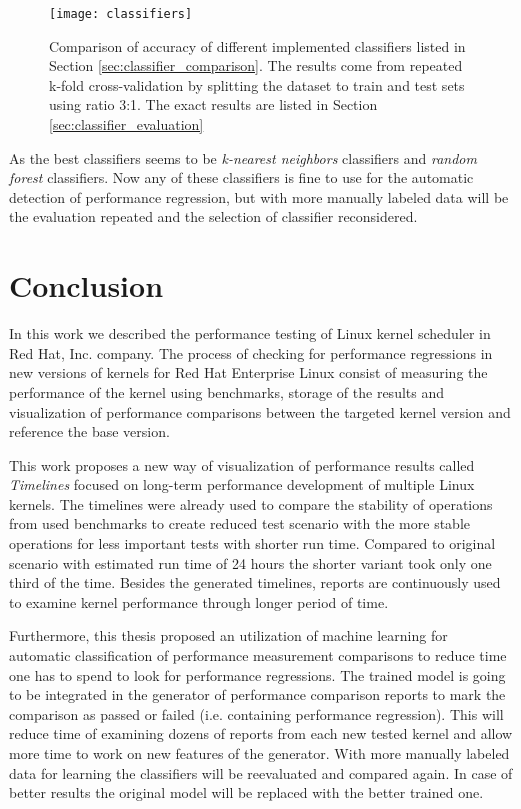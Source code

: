 \begin{figure}
  \centering
  \texttt{[image: classifiers]}
  \caption{Comparison of accuracy of different implemented classifiers listed in Section
    \ref{sec:classifier_comparison}. The results come from repeated k-fold
    cross-validation by splitting the dataset to train and test sets using ratio
    3:1. The exact results are listed in Section \ref{sec:classifier_evaluation}}
  \label{fig:classifiers}
\end{figure}

As the best classifiers seems to be \emph{k-nearest neighbors} classifiers and
\emph{random forest} classifiers. Now any of these classifiers is fine to use
for the automatic detection of performance regression, but with more manually
labeled data will be the evaluation repeated and the selection of classifier
reconsidered.



\chapter{Conclusion}
In this work we described the performance testing of Linux kernel scheduler in Red
Hat, Inc. company. The process of checking for performance regressions in new
versions of kernels for Red Hat Enterprise Linux consist of measuring the
performance of the kernel using benchmarks, storage of the results and
visualization of performance comparisons between the targeted kernel version and
reference the base version.

This work proposes a new way of visualization of performance results called
\emph{Timelines} focused on long-term performance development of multiple Linux
kernels.
The timelines were already used to compare the stability of operations from used
benchmarks to create reduced test scenario with the more stable operations for
less important tests with shorter run time. Compared to original scenario with
estimated run time of 24 hours the shorter variant took only one third of the
time. Besides the generated timelines, reports are continuously used to examine
kernel performance through longer period of time.

Furthermore, this thesis proposed an utilization of machine learning for
automatic classification of performance measurement comparisons to reduce time
one has to spend to look for performance regressions.
The trained model is going to be integrated in the generator of performance
comparison reports to mark the comparison as passed or failed (i.e. containing
performance regression). This will reduce time of examining dozens of reports from
each new tested kernel and allow more time to work on new features of the
generator. With more manually labeled data for learning the classifiers will be
reevaluated and compared again. In case of better results the original model
will be replaced with the better trained one.

